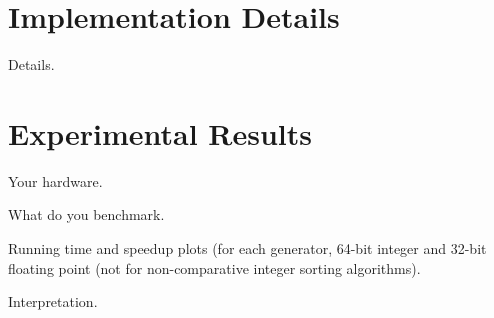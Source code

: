 \documentclass{llncs}
\begin{document}
\section{Implementation Details}

Details.

\section{Experimental Results}

Your hardware.

What do you benchmark.

Running time and speedup plots (for each generator, 64-bit integer and 32-bit floating point (not for  non-comparative integer sorting algorithms).

Interpretation.



\end{document}
